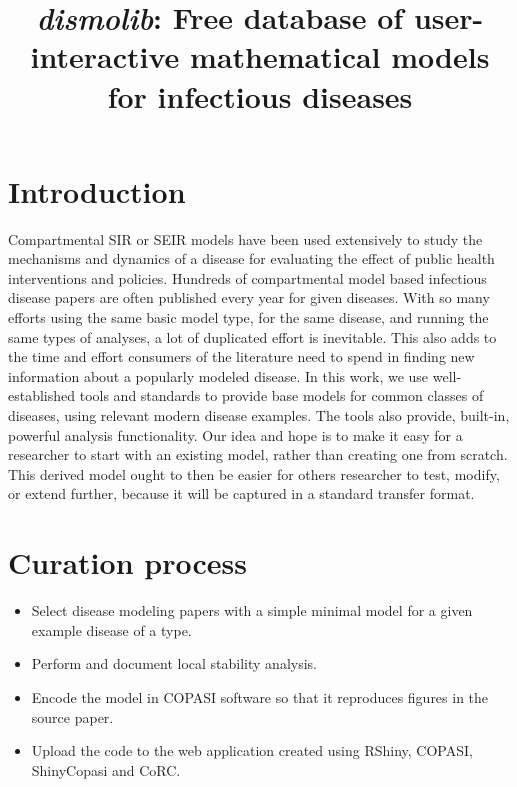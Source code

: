 \documentclass{article}
\title{\textit{dismolib}: Free database of user-interactive mathematical models for infectious diseases}
\author{}
\date{}
\begin{document}
\maketitle

\section{Introduction}
Compartmental SIR or SEIR models have been used extensively to study the mechanisms and dynamics of a disease for evaluating the effect of public health interventions and policies. Hundreds of compartmental model based infectious disease papers are often published every year for given diseases. With so many efforts using the same basic model type, for the same disease, and running the same types of analyses, a lot of duplicated effort is inevitable. This also adds to the time and effort consumers of the literature need to spend in finding new information about a popularly modeled disease. In this work, we use well-established tools and standards to provide base models for common classes of diseases, using relevant modern disease examples. The tools also provide, built-in, powerful analysis functionality. Our idea and hope is to make it easy for a researcher to start with an existing model, rather than creating one from scratch. This derived model ought to then be easier for others researcher to test, modify, or extend further, because it will be captured in a standard transfer format.

\section{Curation process}
\begin{itemize}
    \item Select disease modeling papers with a simple minimal model for a given example disease of a type.
    \item Perform and document local stability analysis.
    \item Encode the model in COPASI software so that it reproduces figures in the source paper.
    \item Upload the code to the web application created using RShiny, COPASI, ShinyCopasi and CoRC.
\end{itemize}
\end{document}
